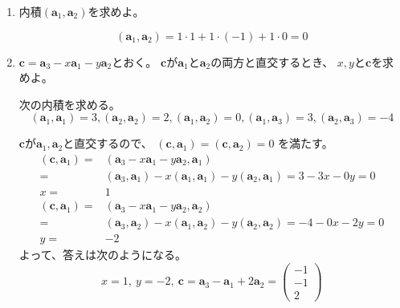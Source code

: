 \documentclass[12pt,b5paper]{ltjsarticle}
\begin{document}
\begin{enumerate}
 \item
      内積$(\bm{a}_1,\bm{a}_2)$を求めよ。

      \dotfill

      \begin{equation}
       (\bm{a}_1,\bm{a}_2) =
        1\cdot 1 + 1\cdot (-1) + 1\cdot 0
        = 0
      \end{equation}

      \hrulefill

 \item
      $\bm{c}= \bm{a}_3 - x \bm{a}_1 - y \bm{a}_2$とおく。
      $\bm{c}$が$\bm{a}_1$と$\bm{a}_2$の両方と直交するとき、
      $x,y$と$\bm{c}$を求めよ。

      \dotfill

      次の内積を求める。
      \begin{equation}
        (\bm{a}_1,\bm{a}_1) = 3,
        (\bm{a}_2,\bm{a}_2) = 2,
        (\bm{a}_1,\bm{a}_2) = 0,
        (\bm{a}_1,\bm{a}_3) = 3,
        (\bm{a}_2,\bm{a}_3) = -4
      \end{equation}

      $\bm{c}$が$\bm{a}_1,\bm{a}_2$と直交するので、
      $(\bm{c},\bm{a}_1) = (\bm{c},\bm{a}_2) = 0$
      を満たす。
      \begin{align}
        (\bm{c},\bm{a}_1)
        =&
        (\bm{a}_3 - x \bm{a}_1 - y \bm{a}_2,\bm{a}_1)\\
        =&
        (\bm{a}_3,\bm{a}_1) -x(\bm{a}_1,\bm{a}_1) -y(\bm{a}_2,\bm{a}_1)
        =
        3-3x-0y =0\\
       x=&1\\
        (\bm{c},\bm{a}_1)
       =&
        (\bm{a}_3 - x \bm{a}_1 - y \bm{a}_2,\bm{a}_2)\\
        =&
        (\bm{a}_3,\bm{a}_2) -x(\bm{a}_1,\bm{a}_2) -y(\bm{a}_2,\bm{a}_2)
        =
        -4-0x-2y =0\\
       y=&-2
      \end{align}
      よって、答えは次のようになる。
      \begin{equation}
       x=1,\ y=-2,\
       \bm{c}=
        \bm{a}_3 - \bm{a}_1 +2 \bm{a}_2
        =\begin{pmatrix}
          -1 \\ -1 \\ 2
         \end{pmatrix}
      \end{equation}


      \hrulefill


\end{enumerate}
\end{document}

